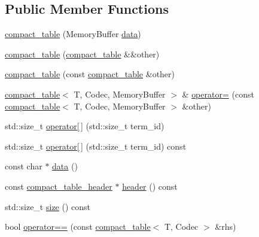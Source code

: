 \subsection*{Public Member Functions}
\begin{DoxyCompactItemize}
\item 
\mbox{\hyperlink{classirk_1_1compact__table_a7837dc73daa2b72450bca208a4a315bb}{compact\+\_\+table}} (Memory\+Buffer \mbox{\hyperlink{classirk_1_1compact__table_a6e52197052d12372b72d568ce9df384f}{data}})
\item 
\mbox{\hyperlink{classirk_1_1compact__table_acdd943c6ec8da8017909598b2e6a4032}{compact\+\_\+table}} (\mbox{\hyperlink{classirk_1_1compact__table}{compact\+\_\+table}} \&\&other)
\item 
\mbox{\hyperlink{classirk_1_1compact__table_ac598641b6433f4912de02fd830dcdaa6}{compact\+\_\+table}} (const \mbox{\hyperlink{classirk_1_1compact__table}{compact\+\_\+table}} \&other)
\item 
\mbox{\hyperlink{classirk_1_1compact__table}{compact\+\_\+table}}$<$ T, Codec, Memory\+Buffer $>$ \& \mbox{\hyperlink{classirk_1_1compact__table_a8a83916106db809f8b93acb1e90104a2}{operator=}} (const \mbox{\hyperlink{classirk_1_1compact__table}{compact\+\_\+table}}$<$ T, Codec, Memory\+Buffer $>$ \&other)
\item 
std\+::size\+\_\+t \mbox{\hyperlink{classirk_1_1compact__table_a3233b841db79f2d8fdba81c880b05d88}{operator\mbox{[}$\,$\mbox{]}}} (std\+::size\+\_\+t term\+\_\+id)
\item 
std\+::size\+\_\+t \mbox{\hyperlink{classirk_1_1compact__table_a0078a7510ab8cb5ace71e69c1bc24afa}{operator\mbox{[}$\,$\mbox{]}}} (std\+::size\+\_\+t term\+\_\+id) const
\item 
const char $\ast$ \mbox{\hyperlink{classirk_1_1compact__table_a6e52197052d12372b72d568ce9df384f}{data}} ()
\item 
const \mbox{\hyperlink{structirk_1_1compact__table__header}{compact\+\_\+table\+\_\+header}} $\ast$ \mbox{\hyperlink{classirk_1_1compact__table_a71a7a452bf75a037e9bf22e231124a5e}{header}} () const
\item 
std\+::size\+\_\+t \mbox{\hyperlink{classirk_1_1compact__table_a868e5c254b459b6ab831681d5e9f34c1}{size}} () const
\item 
bool \mbox{\hyperlink{classirk_1_1compact__table_ab0fbc092d98001d97e8ec78e24f4040d}{operator==}} (const \mbox{\hyperlink{classirk_1_1compact__table}{compact\+\_\+table}}$<$ T, Codec $>$ \&rhs)
\end{DoxyCompactItemize}
